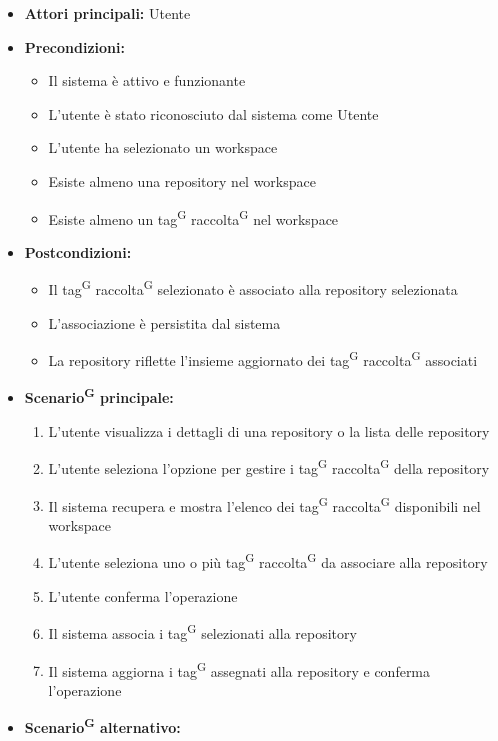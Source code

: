 \documentclass[a4paper, 11pt]{article}
\begin{document}
\begin{itemize}
	\item \textbf{Attori principali:} Utente
	\item \textbf{Precondizioni:} 
	\begin{itemize}
		\item Il sistema è attivo e funzionante
		\item L'utente è stato riconosciuto dal sistema come Utente
		\item L'utente ha selezionato un workspace
		\item Esiste almeno una repository nel workspace
		\item Esiste almeno un tag\textsuperscript{G} raccolta\textsuperscript{G} nel workspace
	\end{itemize}
	\item \textbf{Postcondizioni:} 
	\begin{itemize}
		\item Il tag\textsuperscript{G} raccolta\textsuperscript{G} selezionato è associato alla repository selezionata
		\item L'associazione è persistita dal sistema
		\item La repository riflette l'insieme aggiornato dei tag\textsuperscript{G} raccolta\textsuperscript{G} associati
	\end{itemize}
	\item \textbf{Scenario\textsuperscript{G} principale:}
	\begin{enumerate}
		\item L'utente visualizza i dettagli di una repository o la lista delle repository
		\item L'utente seleziona l'opzione per gestire i tag\textsuperscript{G} raccolta\textsuperscript{G} della repository
		\item Il sistema recupera e mostra l'elenco dei tag\textsuperscript{G} raccolta\textsuperscript{G} disponibili nel workspace
		\item L'utente seleziona uno o più tag\textsuperscript{G} raccolta\textsuperscript{G} da associare alla repository
		\item L'utente conferma l'operazione
		\item Il sistema associa i tag\textsuperscript{G} selezionati alla repository
		\item Il sistema aggiorna i tag\textsuperscript{G} assegnati alla repository e conferma l'operazione
	\end{enumerate}
		\item \textbf{Scenario\textsuperscript{G} alternativo:}

\end{itemize}
\end{document}
